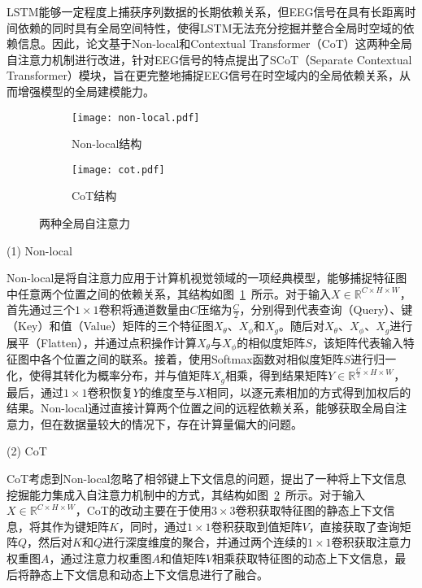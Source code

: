 LSTM能够一定程度上捕获序列数据的长期依赖关系，但EEG信号在具有长距离时间依赖的同时具有全局空间特性，使得LSTM无法充分挖掘并整合全局时空域的依赖信息。因此，论文基于Non-local\cite{wang2018non}和Contextual Transformer（CoT）\cite{li2022contextual}这两种全局自注意力机制进行改进，针对EEG信号的特点提出了SCoT（Separate Contextual Transformer）模块，旨在更完整地捕捉EEG信号在时空域内的全局依赖关系，从而增强模型的全局建模能力。
\begin{figure}[h]
    \centering
    \begin{subfigure}{0.4\textwidth}
      \texttt{[image: non-local.pdf]}
      \caption{Non-local结构\cite{wang2018non}}
      \label{fig:non-local}
    \end{subfigure}\qquad
    \begin{subfigure}{0.4\textwidth}
      \texttt{[image: cot.pdf]}
      \caption{CoT结构\cite{li2022contextual}}
      \label{fig:cot}
    \end{subfigure}
    \caption{两种全局自注意力}
    \label{fig:self}
\end{figure}

(1) Non-local

Non-local是将自注意力\cite{vaswani2017attention}应用于计算机视觉领域的一项经典模型，能够捕捉特征图中任意两个位置之间的依赖关系，其结构如图~\ref{fig:non-local}~所示。对于输入\(X \in \mathbb{R}^{C \times H \times W}\)，首先通过三个\(1\times1\)卷积将通道数量由\(C\)压缩为\(\frac{C}{2}\)，分别得到代表查询（Query）、键（Key）和值（Value）矩阵的三个特征图\(X_\theta\)、\(X_\phi\)和\(X_g\)。随后对\(X_\theta\)、\(X_\phi\)、\(X_g\)进行展平（Flatten），并通过点积操作计算\(X_\theta\)与\(X_\phi\)的相似度矩阵\(S\)，该矩阵代表输入特征图中各个位置之间的联系。接着，使用Softmax函数对相似度矩阵\(S\)进行归一化，使得其转化为概率分布，并与值矩阵\(X_g\)相乘，得到结果矩阵\(Y \in \mathbb{R}^{\frac{C}{2} \times H \times W}\)，最后，通过\(1\times1\)卷积恢复\(Y\)的维度至与\(X\)相同，以逐元素相加的方式得到加权后的结果。Non-local通过直接计算两个位置之间的远程依赖关系，能够获取全局自注意力，但在数据量较大的情况下，存在计算量偏大的问题。

(2) CoT

CoT考虑到Non-local忽略了相邻键上下文信息的问题，提出了一种将上下文信息挖掘能力集成入自注意力机制中的方式，其结构如图~\ref{fig:cot}~所示。对于输入\(X \in \mathbb{R}^{C \times H \times W}\)，CoT的改动主要在于使用\(3\times3\)卷积获取特征图的静态上下文信息，将其作为键矩阵\(K\)，同时，通过\(1\times1\)卷积获取到值矩阵\(V\)，直接获取了查询矩阵\(Q\)，然后对\(K\)和\(Q\)进行深度维度的聚合，并通过两个连续的\(1\times1\)卷积获取注意力权重图\(A\)，通过注意力权重图\(A\)和值矩阵\(V\)相乘获取特征图的动态上下文信息，最后将静态上下文信息和动态上下文信息进行了融合。


